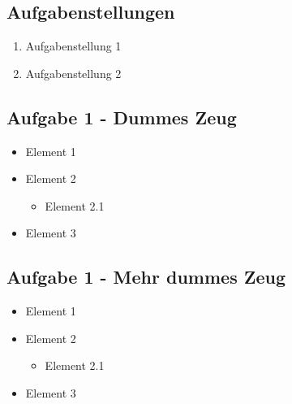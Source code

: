 \subsection*{Aufgabenstellungen}
\begin{enumerate}
    \item Aufgabenstellung 1
    \item Aufgabenstellung 2
\end{enumerate}

\subsection*{Aufgabe 1 - Dummes Zeug}
\begin{itemize}
    \item Element 1
    \item Element 2
    \begin{itemize}
        \item Element 2.1
    \end{itemize}
    \item Element 3
\end{itemize}

\subsection*{Aufgabe 1 - Mehr dummes Zeug}
\begin{itemize}
    \item Element 1
    \item Element 2
    \begin{itemize}
        \item Element 2.1
    \end{itemize}
    \item Element 3
\end{itemize}
